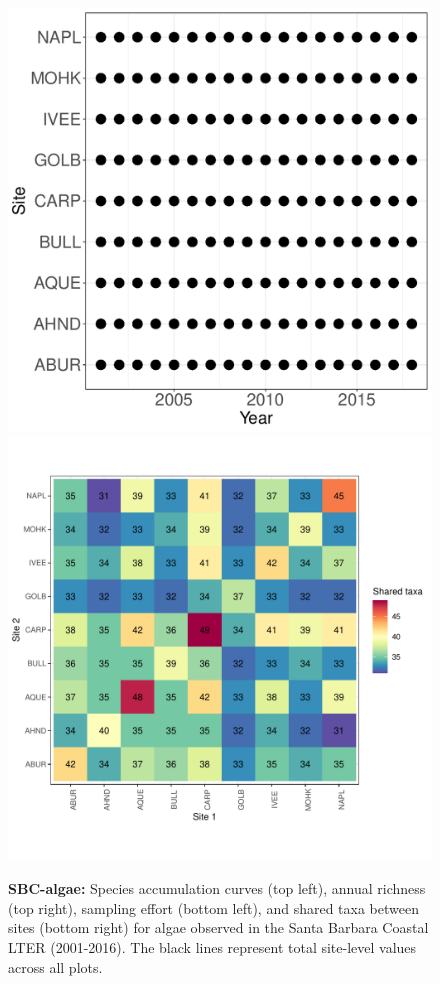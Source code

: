 \documentclass[11pt, oneside]{article}
\begin{document}
\begin{figure}[h!]
\includegraphics[scale = 0.4]{sbc-algae-castorani_spatiotemporal_sampling_effort.pdf}
\includegraphics[scale = 0.4]{sbc-algae-castorani_spp_shared.pdf}
\caption{{\bf SBC-algae:} Species accumulation curves (top left),  annual richness (top right), sampling effort (bottom left), and shared taxa between sites (bottom right) for algae observed in the Santa Barbara Coastal LTER (2001-2016). The black lines represent total site-level values across all plots.}
\label{sbc-algae}
\end{figure}
\end{document}
